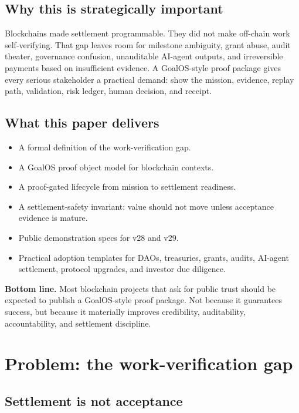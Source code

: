 \subsection*{Why this is strategically important}

Blockchains made settlement programmable. They did not make off-chain work self-verifying. That gap leaves room for milestone ambiguity, grant abuse, audit theater, governance confusion, unauditable AI-agent outputs, and irreversible payments based on insufficient evidence. A GoalOS-style proof package gives every serious stakeholder a practical demand: show the mission, evidence, replay path, validation, risk ledger, human decision, and receipt.

\subsection*{What this paper delivers}

\begin{itemize}
  \item A formal definition of the work-verification gap.
  \item A GoalOS proof object model for blockchain contexts.
  \item A proof-gated lifecycle from mission to settlement readiness.
  \item A settlement-safety invariant: value should not move unless acceptance evidence is mature.
  \item Public demonstration specs for v28 and v29.
  \item Practical adoption templates for DAOs, treasuries, grants, audits, AI-agent settlement, protocol upgrades, and investor due diligence.
\end{itemize}

\begin{executivebox}
\textbf{Bottom line.} Most blockchain projects that ask for public trust should be expected to publish a GoalOS-style proof package. Not because it guarantees success, but because it materially improves credibility, auditability, accountability, and settlement discipline.
\end{executivebox}

\section{Problem: the work-verification gap}

\subsection{Settlement is not acceptance}

